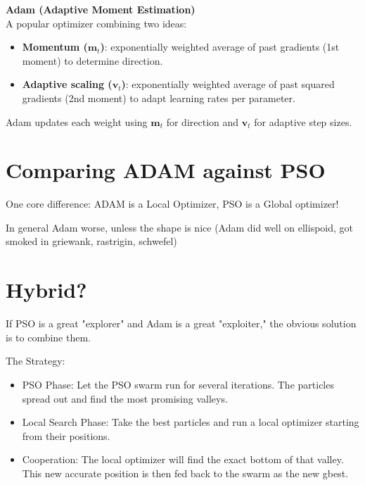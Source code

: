 \textbf{Adam (Adaptive Moment Estimation)}\\
A popular optimizer combining two ideas:
\begin{itemize}
    \item \textbf{Momentum ($\mathbf{m}_t$)}: exponentially weighted average of past gradients (1st moment) to determine direction.
    \item \textbf{Adaptive scaling ($\mathbf{v}_t$)}: exponentially weighted average of past squared gradients (2nd moment) to adapt learning rates per parameter.
\end{itemize}
Adam updates each weight using $\mathbf{m}_t$ for direction and $\mathbf{v}_t$ for adaptive step sizes.

\section*{Comparing ADAM against PSO}

One core difference: ADAM is a Local Optimizer, PSO is a Global optimizer!

In general Adam worse, unless the shape is nice (Adam did well on ellispoid, got smoked in 
griewank, rastrigin, schwefel)

\section*{Hybrid?}

If PSO is a great "explorer" and Adam is a great "exploiter," the obvious solution is to combine them.
    
The Strategy:
\begin{itemize}
    \item PSO Phase: Let the PSO swarm run for several iterations. 
    The particles spread out and find the most promising valleys.
    \item Local Search Phase: 
    Take the best particles and run a local optimizer starting from their positions.
    \item Cooperation: The local optimizer  will find the exact bottom of that valley. 
    This new accurate position is then fed back to the swarm as the new gbest.
\end{itemize}
        

        

        